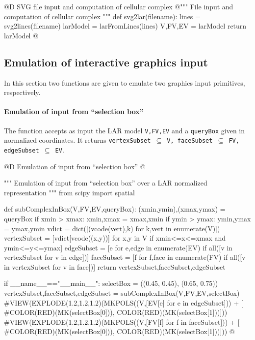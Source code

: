 \documentclass[11pt,oneside]{article}    %
\begin{document}
@D SVG file input and computation of cellular complex
@{""" File input and computation of cellular complex """
def svg2lar(filename):
    lines = svg2lines(filename)
    larModel = larFromLines(lines)
    V,FV,EV = larModel
    return larModel
@}


\subsection{Emulation of interactive graphics input}

In this section two functions are given to emulate two graphics input primitives, respectively.

\paragraph{Emulation of input from ``selection box''}
The function accepts as input the LAR model \texttt{V,FV,EV} and a \texttt{queryBox} given in normalized coordinates. It returns \texttt{vertexSubset $\subseteq$ V, faceSubset $\subseteq$ FV, edgeSubset $\subseteq$ EV}.

@D Emulation of input from ``selection box''
@{""" Emulation of input from ``selection box'' over a LAR normalized representation """
from scipy import spatial

def subComplexInBox(V,FV,EV,queryBox):
    (xmin,ymin),(xmax,ymax) = queryBox
    if xmin > xmax: xmin,xmax = xmax,xmin
    if ymin > ymax: ymin,ymax = ymax,ymin
    vdict = dict([(vcode(vert),k) for k,vert in enumerate(V)])
    vertexSubset = [vdict[vcode((x,y))] for x,y in V if xmin<=x<=xmax and ymin<=y<=ymax]
    edgeSubset = [e for e,edge in enumerate(EV) if all([v in vertexSubset  for v in edge])]    
    faceSubset = [f for f,face in enumerate(FV) if all([v in vertexSubset  for v in face])]
    return vertexSubset,faceSubset,edgeSubset

if __name__=="__main__":
    selectBox = ((0.45, 0.45), (0.65, 0.75))
    vertexSubset,faceSubset,edgeSubset = subComplexInBox(V,FV,EV,selectBox)
    #VIEW(EXPLODE(1.2,1.2,1.2)(MKPOLS((V,[EV[e] for e in edgeSubset])) + [
        #COLOR(RED)(MK(selectBox[0])),  COLOR(RED)(MK(selectBox[1]))]))
    #VIEW(EXPLODE(1.2,1.2,1.2)(MKPOLS((V,[FV[f] for f in faceSubset])) + [
        #COLOR(RED)(MK(selectBox[0])),  COLOR(RED)(MK(selectBox[1]))]))
@}
\end{document}

